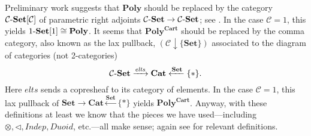 \documentclass[11pt, one side, article]{memoir}
\theoremstyle{definition}
\theoremstyle{plain}
\newcommand{\cat}[1]{\mathcal{#1}}%
\newcommand{\Cat}[1]{\mathbf{#1}}%
\newcommand{\Fun}[1]{\mathit{#1}}%
\newcommand{\To}[2][]{\xrightarrow[#1]{#2}}
\newcommand{\From}[1]{\xleftarrow{#1}}
\newcommand{\tn}[1]{\textnormal{#1}}
\newcommand{\smset}{\Cat{Set}}
\newcommand{\smcat}{\Cat{Cat}}
\newcommand{\set}{\tn{-}\Cat{Set}}
\newcommand{\poly}{\Cat{Poly}}
\newcommand{\polycart}{\poly^{\Cat{Cart}}}
\newcommand{\0}{\textsf{0}}
\newcommand{\1}{\tn{\textsf{1}}}
\newcommand{\tri}{\mathbin{\triangleleft}}
\newcommand{\indep}{\Fun{Indep}}
\newcommand{\duoid}{\Fun{Duoid}}
\begin{document}
Preliminary work suggests that $\poly$ should be replaced by the category $\cat{C}\set[\cat{C}]$ of parametric right adjoints $\cat{C}\set\to\cat{C}\set$; see \cite{spivak2021functorial}. In the case $\cat{C}=1$, this yields $1\set[1]\cong\poly$. It seems that $\polycart$ should be replaced by the comma category, also known as the lax pullback, $(\cat{C}\downarrow\{\smset\})$ associated to the diagram of categories (not 2-categories)
\[\cat{C}\set\To{\Fun{elts}}\smcat\From{\smset}\{*\}.\]
Here $\Fun{elts}$ sends a copresheaf to its category of elements. In the case $\cat{C}=1$, this lax pullback of $\smset\to\smcat\From{\smset}\{*\}$ yields $\polycart$. Anyway, with these definitions at least we know that the pieces we have used---including $\otimes,\tri,\indep,\duoid$, etc.---all make sense; again see \cite{spivak2021functorial} for relevant definitions. 




\printbibliography
\end{document}
